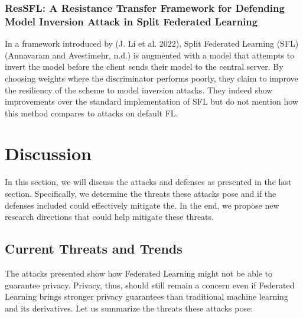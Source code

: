 \documentclass[
  compsoc]{IEEEtran}
\begin{document}
\hypertarget{ressfl-a-resistance-transfer-framework-for-defending-model-inversion-attack-in-split-federated-learning}{%
\subsubsection{ResSFL: A Resistance Transfer Framework for Defending
Model Inversion Attack in Split Federated
Learning}\label{ressfl-a-resistance-transfer-framework-for-defending-model-inversion-attack-in-split-federated-learning}}

In a framework introduced by (J. Li et al. 2022), Split Federated
Learning (SFL) (Annavaram and Avestimehr, n.d.) is augmented with a
model that attempts to invert the model before the client sends their
model to the central server. By choosing weights where the discriminator
performs poorly, they claim to improve the resiliency of the scheme to
model inversion attacks. They indeed show improvements over the standard
implementation of SFL but do not mention how this method compares to
attacks on default FL.

\hypertarget{discussion}{%
\section{Discussion}\label{discussion}}

In this section, we will discuss the attacks and defenses as presented
in the last section. Specifically, we determine the threats these
attacks pose and if the defenses included could effectively mitigate
the. In the end, we propose new research directions that could help
mitigate these threats.

\hypertarget{current-threats-and-trends}{%
\subsection{Current Threats and
Trends}\label{current-threats-and-trends}}

The attacks presented show how Federated Learning might not be able to
guarantee privacy. Privacy, thus, should still remain a concern even if
Federated Learning brings stronger privacy guarantees than traditional
machine learning and its derivatives. Let us summarize the threats these
attacks pose:
\end{document}
